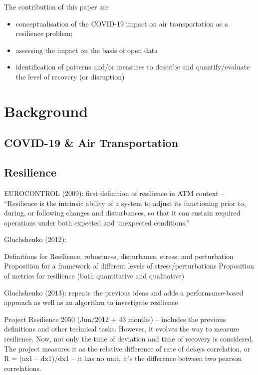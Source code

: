 \documentclass[conference,final,]{IEEEtran}
\begin{document}
The contribution of this paper are

\begin{itemize}
\item
  conceptualisation of the COVID-19 impact on air transportation as a resilience problem;
\item
  assessing the impact on the basis of open data
\item
  identification of patterns and/or measures to describe and quantify/evaluate the level of recovery (or disruption)
\end{itemize}

\hypertarget{background}{%
\section{Background}\label{background}}

\hypertarget{covid-19-air-transportation}{%
\subsection{COVID-19 \& Air Transportation}\label{covid-19-air-transportation}}

\hypertarget{resilience}{%
\subsection{Resilience}\label{resilience}}

EUROCONTROL (2009): first definition of resilience in ATM context -- ``Resilience is the intrinsic ability of a system to adjust its functioning prior to, during, or following changes and disturbances, so that it can sustain required operations under both expected and unexpected conditions.''

Gluchshenko (2012):

Definitions for Resilience, robustness, disturbance, stress, and perturbation Proposition for a framework of different levels of stress/perturbations Proposition of metrics for resilience (both quantitative and qualitative)

Gluchshenko (2013): repeats the previous ideas and adds a performance-based approach as well as an algorithm to investigate resilience

Project Resilience 2050 (Jun/2012 + 43 months) -- includes the previous definitions and other technical tasks. However, it evolves the way to measure resilience. Now, not only the time of deviation and time of recovery is considered. The project measures it as the relative difference of rate of delays correlation, or R = (ax1 -- dx1)/dx1 -- it has no unit, it's the difference between two pearson correlations.
\end{document}
